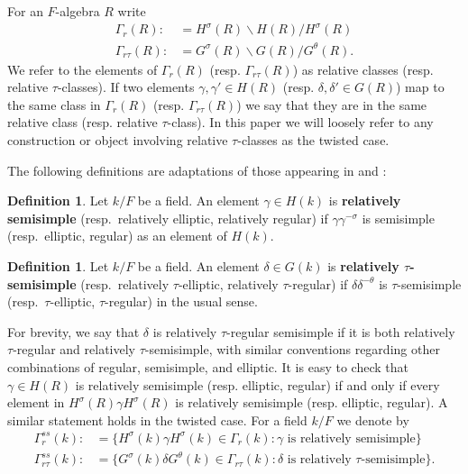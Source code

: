 \documentclass[12pt]{amsart}
\theoremstyle{remark}
\numberwithin{equation}{section}
\theoremstyle{definition}
\newtheorem{defn}[thm]{Definition}
\numberwithin{equation}{subsection}
\begin{document}
For an $F$-algebra $R$
write
\begin{align}
\Gamma_r(R):&=H^{\sigma}(R) \backslash H(R) /H^{\sigma}(R)\\
\nonumber \Gamma_{r\tau}(R):&=G^{\sigma}(R) \backslash G(R) /G^{\theta}(R).
\end{align}We refer to the elements of $\Gamma_r(R)$ (resp. $\Gamma_{r\tau}(R)$) as relative classes (resp. relative $\tau$-classes).
If two elements $\gamma,\gamma' \in H(R)$ (resp. $\delta,\delta' \in G(R)$) map to the same
class in $\Gamma_r(R)$ (resp. $\Gamma_{r\tau}(R)$) we say that they are in the same relative class
(resp. relative $\tau$-class).  In this paper we will loosely refer to any construction or object involving
relative $\tau$-classes as the twisted case.

The
following definitions are adaptations of those appearing in
\cite{JacquetLai} and \cite{FlickerRTF}:
\begin{defn}  Let $k/F$ be a field.
An element $\gamma \in H(k)$ is \textbf{relatively semisimple} (resp.~relatively elliptic, relatively regular) if $\gamma \gamma^{-\sigma}$  is semisimple
(resp.~elliptic, regular) as an element of $H(k)$.
\end{defn}

\begin{defn} Let $k/F$ be a field.  An element $\delta \in G(k)$ is
\textbf{relatively $\tau$-semisimple} (resp.~relatively $\tau$-elliptic, relatively $\tau$-regular) if
$\delta\delta^{-\theta}$ is $\tau$-semisimple (resp.~$\tau$-elliptic, $\tau$-regular) in the usual sense.
\end{defn}

For brevity, we say that $\delta$ is relatively $\tau$-regular semisimple if it is
both relatively $\tau$-regular and relatively $\tau$-semisimple, with similar
conventions regarding other combinations of regular, semisimple, and elliptic.
It is easy to check that $\gamma \in H(R)$ is relatively semisimple
(resp. elliptic, regular) if and only if every element in $H^{\sigma}(R)\gamma H^{\sigma}(R)$
is relatively semisimple (resp. elliptic, regular).  A similar statement holds in the twisted case. For a field $k/F$  we denote by
\begin{align}
\Gamma_r^{ss}(k):&=\{H^{\sigma}(k)\gamma H^{\sigma}(k) \in \Gamma_r(k):\gamma \textrm{ is
relatively semisimple}\}\\
\nonumber \Gamma_{r\tau}^{ss}(k):&=\{G^{\sigma}(k)\delta G^{\theta}(k) \in \Gamma_{r\tau}(k):\delta \textrm{ is relatively }\tau\textrm{-semisimple}\}.
\end{align} 
\end{document}
